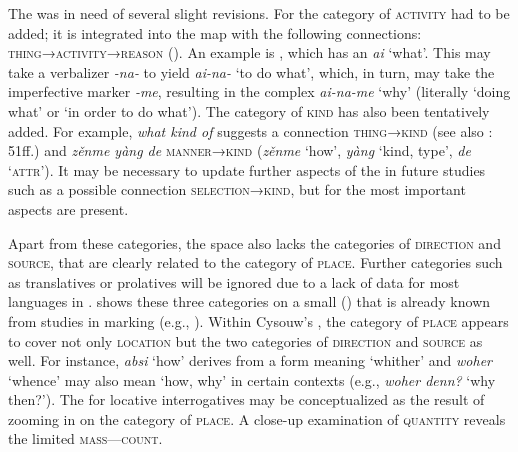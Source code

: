 The  was in need of several slight revisions. For  the category of \textsc{activity} had to be added; it is integrated into the map with the following connections: \textsc{thing→activity→reason} (\citealt{Hölzl2015c}). An example is , which has an  \textit{ai} ‘what’. This  may take a verbalizer \textit{-na-} to yield \textit{ai-na-} ‘to do what’, which, in turn, may take the imperfective  marker \textit{-me}, resulting in the complex  \textit{ai-na-me} ‘why’ (literally ‘doing what’ or ‘in order to do what’). The category of \textsc{kind} has also been tentatively added. For example,  \textit{what kind of} suggests a connection \textsc{thing→kind} (see also \citealt{Idiatov2007}: 51ff.) and  \textit{zěnme yàng de} \textsc{manner→kind} (\textit{zěnme} ‘how’, \textit{yàng} ‘kind, type’, \textit{de} ‘\textsc{attr}’). It may be necessary to update further aspects of the  in future studies such as a possible connection \textsc{selection→kind}, but for  the most important aspects are present.

Apart from these categories, the space also lacks the categories of \textsc{direction} and \textsc{source}, that are clearly related to the category of \textsc{place}. Further categories such as translatives or prolatives will be ignored due to a lack of data for most languages in .  shows these three categories on a small  (\citealt{Hölzl2015c}) that is already known from studies in  marking (e.g., \citealt{Creissels2006}). Within Cysouw’s , the category of \textsc{place} appears to cover not only \textsc{location} but the two categories of \textsc{direction} and \textsc{source} as well. For instance,  \textit{absi} ‘how’ derives from a form meaning ‘whither’ and  \textit{woher} ‘whence’ may also mean ‘how, why’ in certain contexts (e.g., \textit{woher denn?} ‘why then?’). The  for locative interrogatives may be conceptualized as the result of zooming in on the category of \textsc{place}. A close-up examination of \textsc{quantity} reveals the limited  \textsc{mass}---\textsc{count}.

